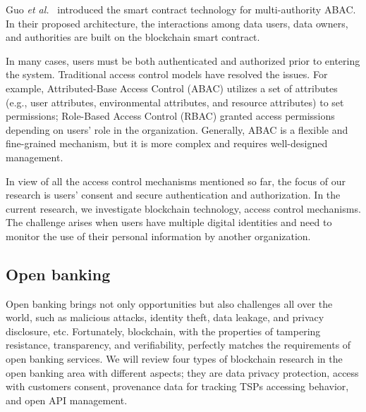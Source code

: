 Guo \emph{et al.}~\cite{guo2019multi} introduced the smart contract technology for multi-authority ABAC. In their proposed architecture, the interactions among data users, data owners, and authorities are built on the blockchain smart contract.\par

In many cases, users must be both authenticated and authorized prior to entering the system. Traditional access control models have resolved the issues. For example, Attributed-Base Access Control (ABAC) utilizes a set of attributes (e.g., user attributes, environmental attributes, and resource attributes) to set permissions; Role-Based Access Control (RBAC) granted access permissions depending on users' role in the organization. Generally, ABAC is a flexible and fine-grained mechanism, but it is more complex and requires well-designed management.\par

In view of all the access control mechanisms mentioned so far, the focus of our research is users' consent and secure authentication and authorization. In the current research, we investigate blockchain technology, access control mechanisms. The challenge arises when users have multiple digital identities and need to monitor the use of their personal information by another organization.\par

\subsection{Open banking}
Open banking brings not only opportunities but also challenges all over the world, such as malicious attacks, identity theft, data leakage, and privacy disclosure, etc. Fortunately, blockchain, with the properties of tampering resistance, transparency, and verifiability, perfectly matches the requirements of open banking services. We will review four types of blockchain research in the open banking area with different aspects; they are data privacy protection, access with customers consent, provenance data for tracking TSPs accessing behavior, and open API management.\par

